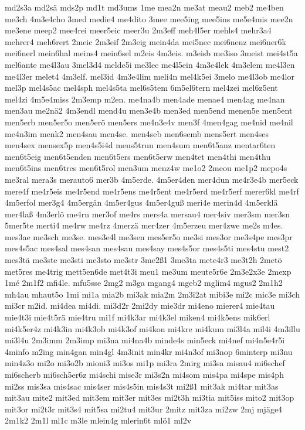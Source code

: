 {md2s3a
md2sä
mds2p
md1t
md3ums
1me
mea2n
me3at
meau2
meb2
me4ben
me3ch
4m3e4cho
3med
medie4
me4dito
3mee
mee5ing
mee5ins
me5e4mis
mee2n
me3ene
meep2
mee4rei
meer5eic
meer3u
2m3eff
meh4l5er
mehls4
mehr3a4
mehrer4
meh6rert
2meic
2m3eif
2m3eig
mein4da
mei5nec
mei6nenz
mei6ner6k
mei6nerl
mein6hal
meins4
mein6sel
m2eis
4m3eis.
m3eisb
me3iso
3meist
mei4st5a
mel6ante
me4l3au
3mel3d4
melde5i
me3lec
me4l5ein
4m3e4lek
4m3elem
me4l3en
me4l3er
melet4
4m3elf.
mel3id
4m3e4lim
meli4n
mel4k5ei
3melo
me4l3ob
me4lor
mel3p
mel4s5ac
mel4sph
mel4s5ta
mel6s5tem
6m5el6tern
mel4zei
mel6z5ent
mel4zi
4m5e4miss
2m3emp
m2en.
me4na4b
men4ade
menae4
men4ag
me4nan
men3au
me2nä2
4m3endl
mend4u
men3e4b
men3ed
men5end
menen5e
men5ent
men5erb
men5er5o
men5erö
men5ers
me4n3e4v
men3f
4men4gag
me4nid
me4nil
me4n3im
menk2
men4sau
men4se.
men4seb
men6semb
mens5ert
men4ses
men4sex
mensex5p
men4s5i4d
mens5trun
men4sum
men6t5anz
mentar6ten
men6t5eig
men6t5enden
men6t5ers
men6t5erw
men4tet
men4thi
men4thu
men6t5ins
men6tres
men6t5rol
men3um
menz4w
me1o2
2meou
me1p2
mepo4s
me3ral
mera3s
merauto6
mer3b
4m5erde.
4m5er4den
mer4dun
me4r3e4b
mer5eck
mere4f
me4r5eis
me4r5end
me4r5ens
me4r5ent
me4r5erd
me4r5erf
merer6kl
me4rf
4m5erfol
mer3g4
4m5ergän
4m5er4gus
4m5er4guß
meri4e
merin4d
4m5erklä
mer4laß
4m3erlö
me4rn
mer3of
me4rs
mers4a
mersau4
mer4siv
mer3sm
mer3sn
5mer5te
merti4
me4rw
me4rz
4merzä
mer4zer
4m5erzeu
mer4zwe
me2s
m4es.
mes3ae
me3sch
me3se.
mes3e4l
me3sen
mes5er5o
me3si
mes3or
me3s4pe
mes3pr
mes4s5ac
mes4sal
mes4san
mes4sau
mes4say
mes4s5or
mes4s5ti
mes4stu
mest2
mes3tä
me3ste
me3sti
me3sto
me3str
3me2ß1
3me3ta
mete4r3
me3t2h
2metö
met5res
me4trig
mett5en6de
met4t3i
meu1
me3um
meute5r6e
2m3e2x3e
2mexp
1mé
2m1f2
mfi4le.
mfu5sse
2mg2
m3ga
mgang4
mgeb2
mglim4
mgus2
2m1h2
mh4au
mhaut5o
1mi
mi1a
mia2b
mi3ak
mia2m
2m3i2at
mibi3e
mi2c
mic3e
mi3ch
mi3cr
m2id.
mi4dea
mi4di.
mi3d2r
2mi2dy
mie3dr
mi4eno
mierer4
mie4tau
mie4t3i
mie4t5rä
mie4tru
mi1f
mi4k3ar
mi4k3el
miken4
mi4k5ens
mik6erl
mi4k5er4z
mi4k3in
mi4k3ob
mi4k3of
mi4kon
mi4kre
mi4kum
mi3l4a
mil4i
4m3illu
mi3l4u
2m3imm
2m3imp
mi3na
mi4na4b
minde4s
min5eck
mi4nef
mi4n5e4r5i
4minfo
m2ing
min4gan
min4gl
4m3init
min4kr
mi4n3of
mi3nop
6minterp
mi3nu
min4z3o
mi2o
mi3o2b
mioni3
mi3os
mi1p
mi3ra
2mirg
mi3sa
misau4
mi6schef
mi6scherb
mi6sch5er6z
mi4schi
mise3r
mi3s2n
mi4som
mis4pa
mi4spe
mis4ph
mi2ss
mis3sa
mis4sac
mis4ser
mis4s5in
mis4s3t
mi2ß1
mit3ak
mi4tar
mit3as
mit3au
mite2
mit3ed
mit3em
mit3er
mit3es
mi2t3h
mi3tia
mit5iss
mito2
mit3op
mit3or
mi2t3r
mit3s4
mit5sa
mi2tu4
mit3ur
2mitz
mit3za
mi2zw
2mj
mjäge4
2m1k2
2m1l
ml1c
m3le
mlein4g
mlerin6t
mlö1
ml2v
}
